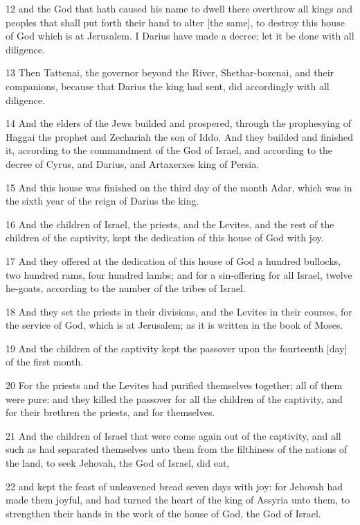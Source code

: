 \par 12 and the God that hath caused his name to dwell there overthrow all kings and peoples that shall put forth their hand to alter [the same], to destroy this house of God which is at Jerusalem. I Darius have made a decree; let it be done with all diligence.
\par 13 Then Tattenai, the governor beyond the River, Shethar-bozenai, and their companions, because that Darius the king had sent, did accordingly with all diligence.
\par 14 And the elders of the Jews builded and prospered, through the prophesying of Haggai the prophet and Zechariah the son of Iddo. And they builded and finished it, according to the commandment of the God of Israel, and according to the decree of Cyrus, and Darius, and Artaxerxes king of Persia.
\par 15 And this house was finished on the third day of the month Adar, which was in the sixth year of the reign of Darius the king.
\par 16 And the children of Israel, the priests, and the Levites, and the rest of the children of the captivity, kept the dedication of this house of God with joy.
\par 17 And they offered at the dedication of this house of God a hundred bullocks, two hundred rams, four hundred lambs; and for a sin-offering for all Israel, twelve he-goats, according to the number of the tribes of Israel.
\par 18 And they set the priests in their divisions, and the Levites in their courses, for the service of God, which is at Jerusalem; as it is written in the book of Moses.
\par 19 And the children of the captivity kept the passover upon the fourteenth [day] of the first month.
\par 20 For the priests and the Levites had purified themselves together; all of them were pure: and they killed the passover for all the children of the captivity, and for their brethren the priests, and for themselves.
\par 21 And the children of Israel that were come again out of the captivity, and all such as had separated themselves unto them from the filthiness of the nations of the land, to seek Jehovah, the God of Israel, did eat,
\par 22 and kept the feast of unleavened bread seven days with joy: for Jehovah had made them joyful, and had turned the heart of the king of Assyria unto them, to strengthen their hands in the work of the house of God, the God of Israel.


